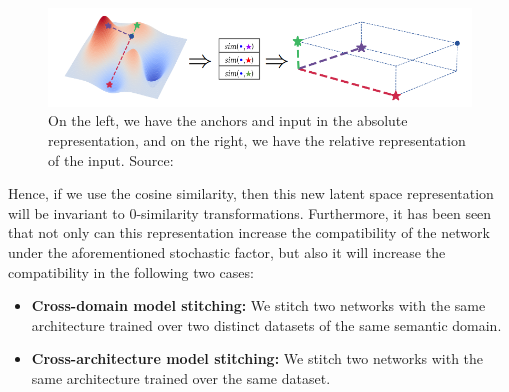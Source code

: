 \documentclass[../main.tex]{subfiles}
\begin{document}
\begin{figure}[!ht]
    \centering
    \includegraphics[width=\textwidth]{figures/bg/relativeSche.png} 
    \caption{On the left, we have the anchors and input in the absolute representation, and on the right, we have the relative representation of the input. Source: \cite{moschella_relative_2022}}
    \label{fig:relativeSche}
\end{figure}

Hence, if we use the cosine similarity, then this new latent space representation will be invariant to $0$-similarity transformations. Furthermore, it has been seen that not only can this representation increase the compatibility of the network under the aforementioned stochastic factor, but also it will increase the compatibility in the following two cases:

\begin{itemize}
    \item \textbf{Cross-domain model stitching:} We stitch two networks with the same architecture trained over two distinct datasets of the same semantic domain.
    \item \textbf{Cross-architecture model stitching:} We stitch two networks with the same architecture trained over the same dataset.
\end{itemize}
\end{document}
